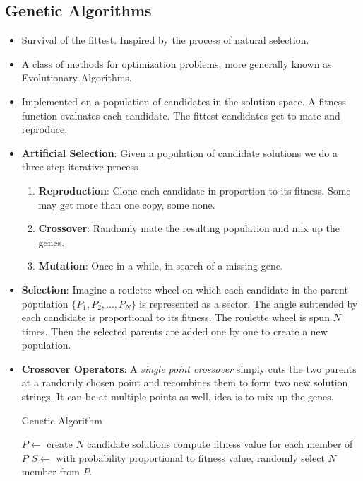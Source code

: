 \documentclass[a4paper]{article}
\begin{document}
\subsection{Genetic Algorithms}
\begin{itemize}
    \item Survival of the fittest. Inspired by the process of natural selection.
    \item A class of methods for optimization problems, more generally known as Evolutionary Algorithms.
    \item Implemented on a population of candidates in the solution space. A fitness function evaluates each candidate. The fittest candidates get to mate and reproduce.
    \item \textbf{Artificial Selection}: Given a population of candidate solutions we do a three step iterative process
    \begin{enumerate}
        \item \textbf{Reproduction}: Clone each candidate in proportion to its fitness. Some may get more than one copy, some none.
        \item \textbf{Crossover}: Randomly mate the resulting population and mix up the genes.
        \item \textbf{Mutation}: Once in a while, in search of a missing gene.
    \end{enumerate}
    \item \textbf{Selection}: Imagine a roulette wheel on which each candidate in the parent population $\{P_1,P_2,...,P_N\}$ is represented as a sector. The angle subtended by each candidate is proportional to its fitness. The roulette wheel is spun $N$ times. Then the selected parents are added one by one to create a new population.
    \item \textbf{Crossover Operators}: A \textit{single point crossover} simply cuts the two parents at a randomly chosen point and recombines them to form two new solution strings. It can be at multiple points as well, idea is to mix up the genes.
    \begin{algorithm}[H]
        \caption{Genetic Algorithm}\label{alg:genetic-algorithm}
        \begin{algorithmic}[1]
            \Statex {}
            \State $P\gets$ create $N$ candidate solutions 
            \Repeat
                \State compute fitness value for each member of $P$
                \State $S\gets$ with probability proportional to fitness value, randomly select $N$ member from $P$.

\end{algorithmic}
\end{algorithm}
\end{itemize}
\end{document}
